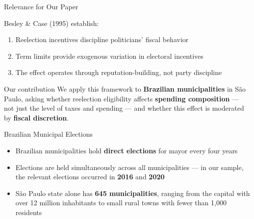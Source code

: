 \documentclass{beamer}
\begin{document}
\begin{frame}{Relevance for Our Paper}
\begin{block}{Besley \& Case (1995) establish:}
\begin{enumerate}
    \item Reelection incentives discipline politicians' fiscal behavior
    \item Term limits provide exogenous variation in electoral incentives
    \item The effect operates through reputation-building, not party discipline
\end{enumerate}
\end{block}
\vspace{0.5em}
\begin{alertblock}{Our contribution}
We apply this framework to \textbf{Brazilian municipalities} in São Paulo, asking whether reelection eligibility affects \textbf{spending composition} --- not just the level of taxes and spending --- and whether this effect is moderated by \textbf{fiscal discretion}.
\end{alertblock}
\end{frame}

\begin{frame}{Brazilian Municipal Elections}
\begin{itemize}
    \item Brazilian municipalities hold \textbf{direct elections} for mayor every four years
    \vspace{0.5em}
    \item Elections are held simultaneously across all municipalities --- in our sample, the relevant elections occurred in \textbf{2016} and \textbf{2020}
    \vspace{0.5em}
    \item São Paulo state alone has \textbf{645 municipalities}, ranging from the capital with over 12 million inhabitants to small rural towns with fewer than 1,000 residents
\end{itemize}
\end{frame}
\end{document}
